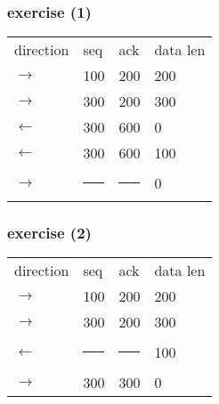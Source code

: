 \begin{frame}
\frametitle{exercise (1)}
\begin{tabular}{llll}
direction & seq & ack & data len \\
$\rightarrow$ & 100 & 200 & 200\\
$\rightarrow$ & 300 & 200 & 300 \\
$\leftarrow$ & 300 & 600 & 0 \\
$\leftarrow$ & 300 & 600 & 100 \\
$\rightarrow$ & \rule{3cm}{1pt} & \rule{3cm}{1pt} & 0 \\
\end{tabular}
\end{frame}

\begin{frame}
\frametitle{exercise (2)}
\begin{tabular}{llll}
direction & seq & ack & data len \\
$\rightarrow$ & 100 & 200 & 200\\
$\rightarrow$ & 300 & 200 & 300 \\
$\leftarrow$ & \rule{3cm}{1pt} & \rule{3cm}{1pt} & 100 \\
$\rightarrow$ & 300 & 300 & 0 \\
\end{tabular}
\end{frame}

